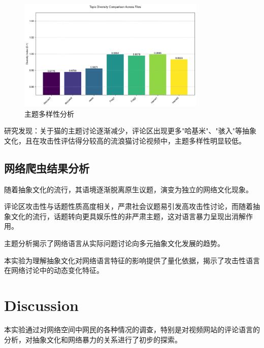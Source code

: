 \documentclass[12pt,a4paper]{ctexart}
\begin{document}
\begin{figure}[htbp]
    \centering
    \includegraphics[width=0.8\textwidth]{img/topic_diversity.png}
    \caption{主题多样性分析}
\end{figure}
\newpage

研究发现：关于猫的主题讨论逐渐减少，评论区出现更多"哈基米"、"骇入"等抽象文化，且在攻击性评估得分较高的流浪猫讨论视频中，主题多样性明显较低。

\subsection{网络爬虫结果分析}

随着抽象文化的流行，其语境逐渐脱离原生议题，演变为独立的网络文化现象。

评论区攻击性与话题性质高度相关，严肃社会议题易引发高攻击性讨论，而随着抽象文化的流行，话题转向更具娱乐性的非严肃主题，这对语言暴力呈现出消解作用。

主题分析揭示了网络语言从实际问题讨论向多元抽象文化发展的趋势。

本实验为理解抽象文化对网络语言特征的影响提供了量化依据，揭示了攻击性语言在网络讨论中的动态变化特征。

\section{Discussion}

本实验通过对网络空间中网民的各种情况的调查，特别是对视频网站的评论语言的分析，对抽象文化和网络暴力的关系进行了初步的探索。
\end{document}
